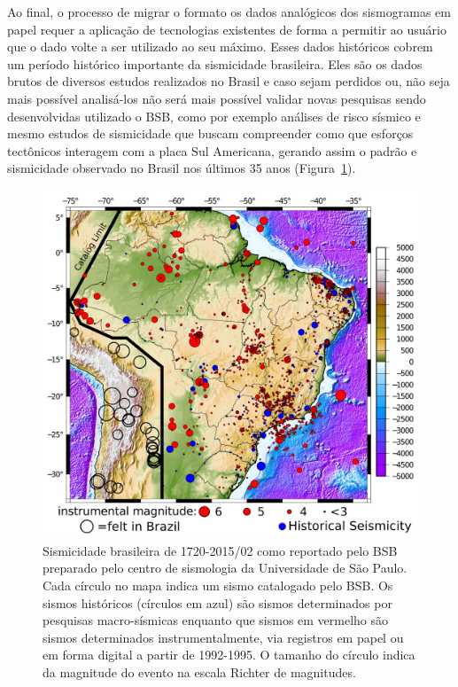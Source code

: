 \documentclass{article}
\begin{document}
Ao final, o processo de migrar o formato os dados analógicos dos
sismogramas em papel requer a aplicação de tecnologias existentes de
forma a permitir ao usuário que o dado volte a ser utilizado ao seu
máximo. Esses dados históricos cobrem um período histórico importante
da sismicidade brasileira. Eles são os dados brutos de diversos
estudos realizados no Brasil e caso sejam perdidos ou, não seja mais
possível analisá-los não será mais possível validar novas pesquisas
sendo desenvolvidas utilizado o BSB, como por exemplo análises de
risco sísmico e mesmo estudos de sismicidade que buscam compreender
como que esforços tectônicos interagem com a placa Sul Americana,
gerando assim o padrão e sismicidade observado no Brasil nos últimos
35 anos (Figura~\ref{sismicidade}).


\begin{figure}[htb]
  \begin{center}
    \includegraphics[scale=0.4]{mapa.png}
    \caption{Sismicidade brasileira de 1720-2015/02 como reportado
      pelo BSB preparado pelo centro de sismologia da Universidade de
      São Paulo. Cada círculo no mapa indica um sismo catalogado pelo
      BSB. Os sismos históricos (círculos em azul) são sismos determinados por pesquisas
      macro-sísmicas enquanto que sismos em vermelho são sismos
      determinados instrumentalmente, via registros em papel ou em
      forma digital a partir de 1992-1995. O tamanho do círculo indica
      da magnitude do evento na escala Richter de magnitudes.}
    \label{sismicidade}
  \end{center}
\end{figure}
\end{document}
